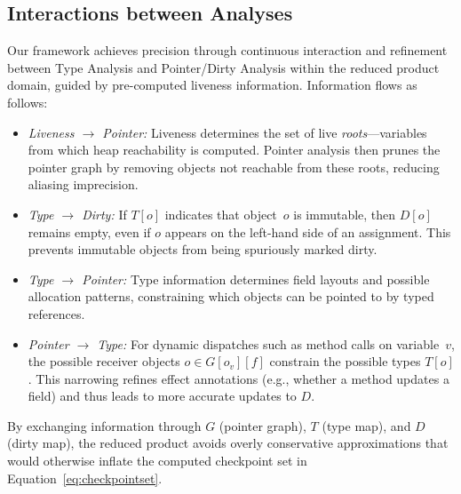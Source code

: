 \subsection{Interactions between Analyses}
Our framework achieves precision through continuous interaction and refinement between Type Analysis and Pointer/Dirty Analysis within the reduced product domain, guided by pre-computed liveness information.
Information flows as follows:
\begin{itemize}
    \item \emph{Liveness $\rightarrow$ Pointer:}
    Liveness determines the set of live \emph{roots}—variables from which heap reachability is computed. Pointer analysis then prunes the pointer graph by removing objects not reachable from these roots, reducing aliasing imprecision.
    \item \emph{Type $\rightarrow$ Dirty:}
    If $T[o]$ indicates that object~$o$ is immutable, then $D[o]$ remains empty, even if $o$ appears on the left-hand side of an assignment. This prevents immutable objects from being spuriously marked dirty.
    \item \emph{Type $\rightarrow$ Pointer:}
    Type information determines field layouts and possible allocation patterns, constraining which objects can be pointed to by typed references.
    \item \emph{Pointer $\rightarrow$ Type:}
    For dynamic dispatches such as method calls on variable~$v$, the possible receiver objects $o \in G[o_v][f]$ constrain the possible types $T[o]$.
    This narrowing refines effect annotations (e.g., whether a method updates a field) and thus leads to more accurate updates to $D$.
\end{itemize}

By exchanging information through $G$ (pointer graph), $T$ (type map), and $D$ (dirty map), the reduced product avoids overly conservative approximations that would otherwise inflate the computed checkpoint set in Equation~\eqref{eq:checkpointset}.


